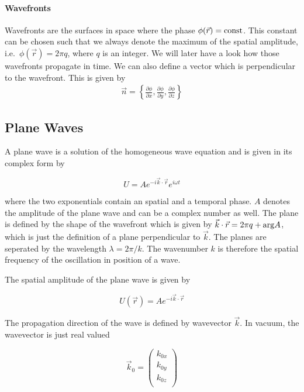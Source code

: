 \documentclass[letterpaper,10pt,english]{sphinxmanual}
\begin{document}
\paragraph{Wavefronts}
\label{\detokenize{notebooks/L8/Wave Optics:Wavefronts}}
Wavefronts are the surfaces in space where the phase \(\phi(\vec{r})={\rm const}\). This constant can be chosen such that we always denote the maximum of the spatial amplitude, i.e. \(\phi(\vec{r})=2\pi q\), where \(q\) is an integer. We will later have a look how those wavefronts propagate in time. We can also define a vector which is perpendicular to the wavefront. This is given by
\begin{equation*}
\begin{split}\vec{n}=\left \{ \frac{\partial \phi}{\partial x},\frac{\partial \phi}{\partial y},\frac{\partial \phi}{\partial z} \right \}\end{split}
\end{equation*}

\subsection{Plane Waves}
\label{\detokenize{notebooks/L8/Wave Optics:Plane-Waves}}
A plane wave is a solution of the homogeneous wave equation and is given in its complex form by

\begin{equation}
U=Ae^{-i\vec{k}\cdot \vec{r}}e^{i\omega t}
\end{equation}

where the two exponentials contain an spatial and a temporal phase. \(A\) denotes the amplitude of the plane wave and can be a complex number as well. The plane is defined by the shape of the wavefront which is given by \(\vec{k}\cdot \vec{r}=2\pi q + {\rm arg}{A}\), which is just the definition of a plane perpendicular to \(\vec{k}\). The planes are seperated by the wavelength \(\lambda=2\pi /k\). The wavenumber \(k\) is therefore the spatial frequency of the oscillation in
position of a wave.

The spatial amplitude of the plane wave is given by

\begin{equation}
U(\vec{r})=Ae^{-i\vec{k}\cdot \vec{r}}
\end{equation}

The propagation direction of the wave is defined by wavevector \(\vec{k}\). In vacuum, the wavevector is just real valued

\begin{equation}
\vec{k}_{0}=
\begin{pmatrix}
k_{0x} \\
k_{0y}\\
k_{0z}\\
\end{pmatrix}
\end{equation}
\end{document}

